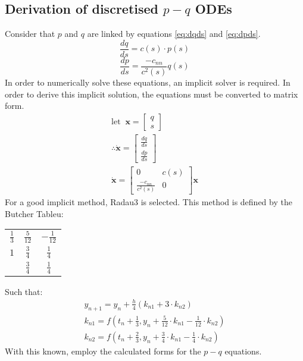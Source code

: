 \documentclass{article}
\begin{document}
\subsection{Derivation of discretised $p-q$ ODEs}
Consider that $p$ and $q$ are linked by equations \ref{eq:dqds} and \ref{eq:dpds}.
\begin{equation}
  \label{eq:dqds}
  \frac{dq}{ds}=c(s)\cdot p(s)
\end{equation}
\begin{equation}
  \label{eq:dpds}
  \frac{dp}{ds}=\frac{-c_{nn}}{c^2(s)}q(s)
\end{equation}
In order to numerically solve these equations, an implicit solver is required. In order to derive this implicit solution, the equations must be converted to matrix form.
\begin{align*}
  \textrm{let}\;\;\bm{x}=\begin{bmatrix}q \\ s \end{bmatrix}\\
  \therefore \dot{\bm{x}}=\begin{bmatrix} \frac{dq}{ds} \\ \frac{dp}{ds}\end{bmatrix}\\
  \dot{\bm{x}} = \begin{bmatrix} 0 & c(s) \\ \frac{-c_{nn}}{c^2(s)} & 0\end{bmatrix}\bm{x}
\end{align*}
For a good implicit method, Radau3 is selected. This method is defined by the Butcher Tableu:
\begin{center}
  \begin{tabular}{c|c c}
    $\frac{1}{3}$ & $\frac{5}{12}$ & $-\frac{1}{12}$ \\
    $1$ & $\frac{3}{4}$ & $\frac{1}{4}$ \\
    \hline
                & $\frac{3}{4}$ & $\frac{1}{4}$
  \end{tabular}
\end{center}
Such that:
\begin{align*}
  y_{n+1} = y_n + \frac{h}{4}\left(k_{n1} + 3\cdot k_{n2} \right)\\
  k_{n1}=f(t_n + \frac{1}{3}, y_n + \frac{5}{12}\cdot k_{n1} -\frac{1}{12}\cdot k_{n2})\\
  k_{n2}=f(t_n + \frac{2}{3}, y_n + \frac{3}{4}\cdot k_{n1} -\frac{1}{4}\cdot k_{n2})
\end{align*}
With this known, employ the calculated forms for the $p-q$ equations.
\begin{align*}
  
\end{align*}
\end{document}
